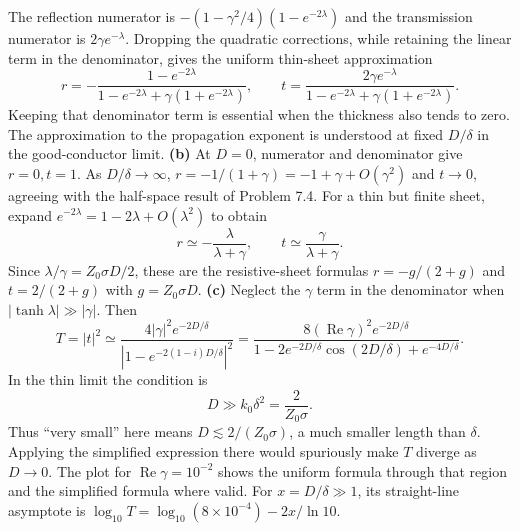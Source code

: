 The reflection numerator is
$-(1-\gamma^2/4)(1-e^{-2\lambda})$ and the transmission numerator
is $2\gamma e^{-\lambda}$. Dropping the quadratic corrections,
while retaining the linear term in the denominator, gives the
uniform thin-sheet approximation
\[
\boxed{r=-\frac{1-e^{-2\lambda}}
 {1-e^{-2\lambda}+\gamma(1+e^{-2\lambda})},\qquad
 t=\frac{2\gamma e^{-\lambda}}
 {1-e^{-2\lambda}+\gamma(1+e^{-2\lambda})}.}
\]
Keeping that denominator term is essential when the thickness also
tends to zero. The approximation to the propagation exponent is
understood at fixed $D/\delta$ in the good-conductor limit.
\textbf{(b)} At $D=0$, numerator and denominator give $r=0,t=1$.
As $D/\delta\to\infty$, $r=-1/(1+\gamma)=-1+\gamma+O(\gamma^2)$
and $t\to0$, agreeing with the half-space result of Problem 7.4.
For a thin but finite sheet, expand $e^{-2\lambda}=1-2\lambda+
O(\lambda^2)$ to obtain
\[
r\simeq-\frac{\lambda}{\lambda+\gamma},\qquad
 t\simeq\frac\gamma{\lambda+\gamma}.
\]
Since $\lambda/\gamma=Z_0\sigma D/2$, these are the resistive-sheet
formulas $r=-g/(2+g)$ and $t=2/(2+g)$ with $g=Z_0\sigma D$.
\textbf{(c)} Neglect the $\gamma$ term in the denominator when
$|\tanh\lambda|\gg|\gamma|$. Then
\[
T=|t|^2\simeq\frac{4|\gamma|^2e^{-2D/\delta}}
 {|1-e^{-2(1-i)D/\delta}|^2}
=\boxed{\frac{8(\operatorname{Re}\gamma)^2e^{-2D/\delta}}
 {1-2e^{-2D/\delta}\cos(2D/\delta)+e^{-4D/\delta}}}.
\]
In the thin limit the condition is
\[
\boxed{D\gg k_0\delta^2=\frac2{Z_0\sigma}.}
\]
Thus ``very small'' here means $D\lesssim2/(Z_0\sigma)$, a much
smaller length than $\delta$. Applying the simplified expression
there would spuriously make $T$ diverge as $D\to0$.
The plot for $\operatorname{Re}\gamma=10^{-2}$ shows the uniform
formula through that region and the simplified formula where valid.
For $x=D/\delta\gg1$, its straight-line asymptote is
$\log_{10}T=\log_{10}(8\times10^{-4})-2x/\ln10$.
\begin{center}

\end{center}

